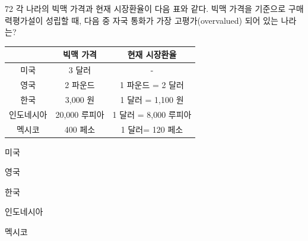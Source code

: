 \begin{question}{72}
각 나라의 빅맥 가격과 현재 시장환율이 다음 표와 같다. 빅맥 가격을 기준으로 구매력평가설이 성립할 때, 다음 중 자국 통화가 가장 고평가(overvalued) 되어 있는 나라는?
\begin{center}
\renewcommand{\arraystretch}{1.1}
\begin{tabular}{|c|c|c|}\hline
 & 빅맥 가격 & 현재 시장환율 \\ \hline
미국 & 3 달러 & - \\ \hline
영국 & 2 파운드 & 1 파운드 = 2 달러 \\ \hline
한국 & 3,000 원 & 1 달러 = 1,100 원 \\ \hline
인도네시아 & 20,000 루피아 & 1 달러 = 8,000 루피아 \\ \hline
멕시코 & 400 페소 & 1 달러= 120 페소 \\ \hline
\end{tabular}
\end{center}
\begin{choices}
  \item 미국
  \item 영국
  \item 한국
  \item 인도네시아
  \item 멕시코
\end{choices}
\end{question}
